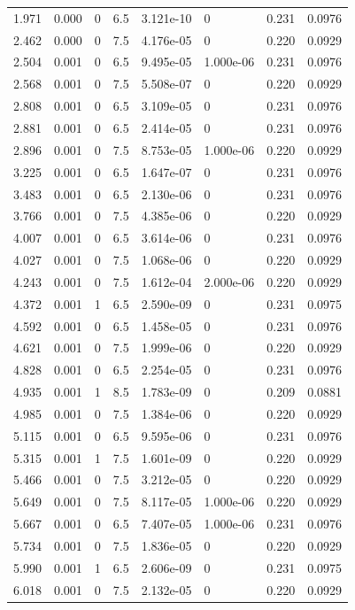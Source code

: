 \documentclass[preview]{standalone}
\begin{document}
{{\begin{tabular}{L{1.2cm}C{1.2cm} C{0.3cm}C{0.5cm} C{1.4cm}C{1.4cm} C{1.4cm}C{1.4cm}}
  1.971  &  0.000  & 0     & 6.5 &  3.121e-10  & 0  & 0.231 &  0.0976   \\ 
  2.462  &  0.000  & 0     & 7.5 &  4.176e-05  & 0  & 0.220 &  0.0929   \\ 
  2.504  &  0.001  & 0     & 6.5 &  9.495e-05  & 1.000e-06  & 0.231 &  0.0976   \\ 
  2.568  &  0.001  & 0     & 7.5 &  5.508e-07  & 0  & 0.220 &  0.0929   \\ 
  2.808  &  0.001  & 0     & 6.5 &  3.109e-05  & 0  & 0.231 &  0.0976   \\ 
  2.881  &  0.001  & 0     & 6.5 &  2.414e-05  & 0  & 0.231 &  0.0976   \\ 
  2.896  &  0.001  & 0     & 7.5 &  8.753e-05  & 1.000e-06  & 0.220 &  0.0929   \\ 
  3.225  &  0.001  & 0     & 6.5 &  1.647e-07  & 0  & 0.231 &  0.0976   \\ 
  3.483  &  0.001  & 0     & 6.5 &  2.130e-06  & 0  & 0.231 &  0.0976   \\ 
  3.766  &  0.001  & 0     & 7.5 &  4.385e-06  & 0  & 0.220 &  0.0929   \\ 
  4.007  &  0.001  & 0     & 6.5 &  3.614e-06  & 0  & 0.231 &  0.0976   \\ 
  4.027  &  0.001  & 0     & 7.5 &  1.068e-06  & 0  & 0.220 &  0.0929   \\ 
  4.243  &  0.001  & 0     & 7.5 &  1.612e-04  & 2.000e-06  & 0.220 &  0.0929   \\ 
  4.372  &  0.001  & 1     & 6.5 &  2.590e-09  & 0  & 0.231 &  0.0975   \\ 
  4.592  &  0.001  & 0     & 6.5 &  1.458e-05  & 0  & 0.231 &  0.0976   \\ 
  4.621  &  0.001  & 0     & 7.5 &  1.999e-06  & 0  & 0.220 &  0.0929   \\ 
  4.828  &  0.001  & 0     & 6.5 &  2.254e-05  & 0  & 0.231 &  0.0976   \\ 
  4.935  &  0.001  & 1     & 8.5 &  1.783e-09  & 0  & 0.209 &  0.0881   \\ 
  4.985  &  0.001  & 0     & 7.5 &  1.384e-06  & 0  & 0.220 &  0.0929   \\ 
  5.115  &  0.001  & 0     & 6.5 &  9.595e-06  & 0  & 0.231 &  0.0976   \\ 
  5.315  &  0.001  & 1     & 7.5 &  1.601e-09  & 0  & 0.220 &  0.0929   \\ 
  5.466  &  0.001  & 0     & 7.5 &  3.212e-05  & 0  & 0.220 &  0.0929   \\ 
  5.649  &  0.001  & 0     & 7.5 &  8.117e-05  & 1.000e-06  & 0.220 &  0.0929   \\ 
  5.667  &  0.001  & 0     & 6.5 &  7.407e-05  & 1.000e-06  & 0.231 &  0.0976   \\ 
  5.734  &  0.001  & 0     & 7.5 &  1.836e-05  & 0  & 0.220 &  0.0929   \\ 
  5.990  &  0.001  & 1     & 6.5 &  2.606e-09  & 0  & 0.231 &  0.0975   \\ 
  6.018  &  0.001  & 0     & 7.5 &  2.132e-05  & 0  & 0.220 &  0.0929   \\ 
\hline 
\end{tabular} 

}}
\end{document}
